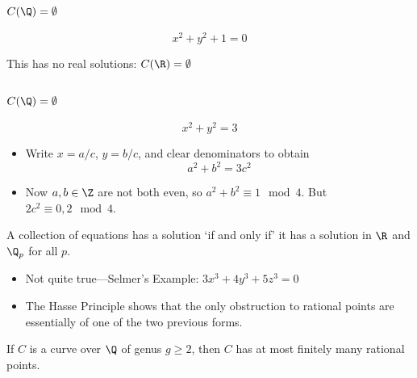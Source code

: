 \begin{frame}[plain]
\frametitle{\textcolor{white}{$C(\Q)=\emptyset$}}

	\[
	x^2+y^2 + 1 = 0 
	\] \pspace

\begin{center} This has no real solutions: $C(\R)= \emptyset$ \end{center}
\end{frame}



\begin{frame}[plain]
\frametitle{\textcolor{white}{$C(\Q)=\emptyset$}}

	\[
	x^2+y^2= 3 
	\] \pspace\pause

\begin{itemize}
\item Write $x=a/c$, $y=b/c$, and clear denominators to obtain
	\[
	a^2+b^2= 3c^2
	\] \pause

\item Now $a,b \in \Z$ are not both even, so $a^2 + b^2 \equiv 1 \mod 4$. But $2c^2 \equiv 0,2 \mod 4$.
\end{itemize}
\end{frame}



\begin{frame}[plain]

\begin{prin}
A collection of equations has a solution `if and only if' it has a solution in $\R$ and $\Q_p$ for all $p$.
\end{prin} \pspace \pause

\begin{itemize}
\item Not quite true---Selmer's Example: $3x^3+4y^3+5z^3=0$
\item The Hasse Principle shows that the only obstruction to rational points are essentially of one of the two previous forms. 
\end{itemize}

\end{frame}



\begin{frame}[plain]
\end{frame}



\begin{frame}[plain]

\begin{thm}
If $C$ is a curve over $\Q$ of genus $g \geq 2$, then $C$ has at most finitely many rational points. 
\end{thm}
\end{frame}




